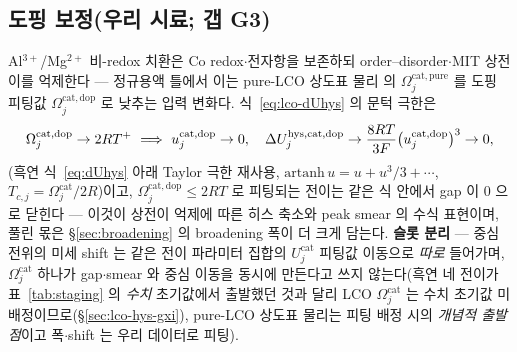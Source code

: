 \subsection{도핑 보정(우리 시료; 갭 G3)}\label{sec:lco-hys-dope}
Al$^{3+}$/Mg$^{2+}$ 비-redox 치환은 Co redox$\cdot$전자항을 보존하되 order--disorder$\cdot$MIT 상전이를
억제한다 --- 정규용액 틀에서 이는 pure-LCO 상도표 물리\cite{reimers1992,vanderven1998} 의 $\Omega_j^\mathrm{cat,pure}$ 를 도핑 피팅값
$\Omega_j^\mathrm{cat,dop}$ 로 낮추는 입력 변화다. 식~\eqref{eq:lco-dUhys} 의 문턱 극한은
\begin{equation}
\Omega_j^\mathrm{cat,dop}\to2RT^+\ \Longrightarrow\
u_j^\mathrm{cat,dop}\to0,\quad
\Delta U_j^{\hys,\mathrm{cat,dop}}\to\frac{8RT}{3F}\big(u_j^\mathrm{cat,dop}\big)^3\to0,
\label{eq:lco-dope}
\end{equation}
(흑연 식~\eqref{eq:dUhys} 아래 Taylor 극한 재사용, $\mathrm{artanh}\,u=u+u^3/3+\cdots$,
$T_{c,j}=\Omega_j^\mathrm{cat}/2R$)이고, $\Omega_j^\mathrm{cat,dop}\le2RT$ 로 피팅되는 전이는 같은 식 안에서
gap 이 0 으로 닫힌다 --- 이것이 상전이 억제에 따른 히스 축소와 peak smear 의 수식 표현이며, 풀린 몫은
\S\ref{sec:broadening} 의 broadening 폭이 더 크게 담는다. \textbf{슬롯 분리} --- 중심 전위의 미세 shift 는
같은 전이 파라미터 집합의 $U_j^\mathrm{cat}$ 피팅값 이동으로 \emph{따로} 들어가며, $\Omega_j^\mathrm{cat}$ 하나가
gap$\cdot$smear 와 중심 이동을 동시에 만든다고 쓰지 않는다(흑연 네 전이가 표~\ref{tab:staging} 의 \emph{수치}
초기값에서 출발했던 것과 달리 LCO $\Omega_j^\mathrm{cat}$ 는 수치 초기값 미배정이므로(\S\ref{sec:lco-hys-gxi}),
pure-LCO 상도표 물리는 피팅 배정 시의 \emph{개념적 출발점}이고 폭$\cdot$shift 는 우리 데이터로 피팅).

